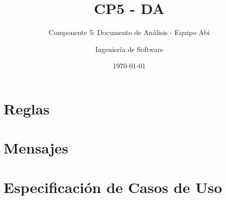 \documentclass[10pt]{book}
\title{CP5 - DA}
\subtitle{Componente 5: Documento de Análisis - Equipo Abi}
\author{Ingeniería de Software}
\date{\today}
\begin{document}
\maketitle
\thispagestyle{empty}
\tableofcontents

%
%
\chapter{Reglas}

\chapter{Mensajes}

\chapter{Especificación de Casos de Uso}

%



%

\end{document}
